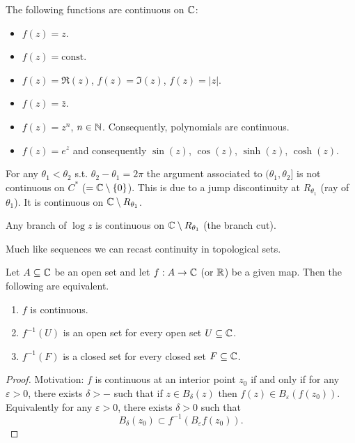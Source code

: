 \documentclass[10pt, a4paper]{article}
\begin{document}
The following functions are continuous on $\mathbb{C}$:
\begin{itemize}[label = -]
    \item $f(z) = z$.

    \item $f(z) = \text{const}$.

    \item $f(z) = \Re(z)$,
    $f(z) = \Im(z)$,
    $f(z) = |z|$.

    \item $f(z) = \bar{z}$.

    \item $f(z) = z ^ n$,
    $n \in \mathbb{N}$.
    Consequently,
    polynomials are continuous.

    \item $f(z) = e ^ z$ and consequently $\sin(z)$,
    $\cos(z)$,
    $\sinh(z)$,
    $\cosh(z)$.
\end{itemize}
For any $\theta_1 < \theta_2$ s.t. $\theta_2 - \theta_1 = 2\pi$ the argument associated to $(\theta_1, \theta_2]$ is not continuous on $C ^ {*}$
($=\mathbb{C} \setminus\{0\}$).
This is due to a jump discontinuity at $R_{\theta_1}$
(ray of $\theta_1$).
It is continuous on $\mathbb{C} \setminus R_{\theta_1}$.

Any branch of $\log{z}$ is continuous on $\mathbb{C} \setminus R_{\theta_1}$
(the branch cut).

Much like sequences we can recast continuity in topological sets.

\begin{theorem}
    Let $A \subseteq \mathbb{C}$ be an open set and let $f : A \to \mathbb{C}$
    (or $\mathbb{R}$)
    be a given map.
    Then the following are equivalent.

    \begin{enumerate}[label = (\roman*)]
        \item $f$ is continuous.

        \item $f ^ {-1}(U)$ is an open set for every open set $U \subseteq \mathbb{C}$.

        \item $f ^ {-1}(F)$ is a closed set for every closed set $F \subseteq \mathbb{C}$.
    \end{enumerate}

    \begin{proof}
        Motivation:
        $f$ is continuous at an interior point $z_0$ if and only if for any $\varepsilon > 0$,
        there exists $\delta > -$ such that if $z \in B_{\delta}(z)$ then $f(z) \in B_{\varepsilon}(f(z_0))$.
        Equivalently for any $\varepsilon > 0$,
        there exists $\delta > 0$ such that
        \[
        B_{\delta}(z_0) \subset f ^ {-1}(B_{\varepsilon}f(z_0)).
        \]
    \end{proof}
\end{theorem}
\end{document}
